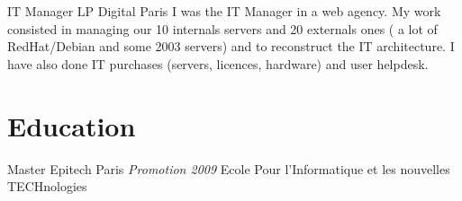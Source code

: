 \documentclass[11pt,a4paper,sans]{moderncv}
\begin{document}
{IT Manager}
{LP Digital}
{Paris}
{}
{I was the IT Manager in a web agency.\newline{}
My work consisted in managing our 10 internals servers and 20 externals ones
( a lot of RedHat/Debian and some 2003 servers) and to reconstruct the IT
architecture.
I have also done IT purchases (servers, licences, hardware) and user helpdesk.
}

\section{Education}

{Master}
{Epitech}
{Paris}
{\textit{Promotion 2009}}
{Ecole Pour l'Informatique et les nouvelles TECHnologies}
\end{document}
